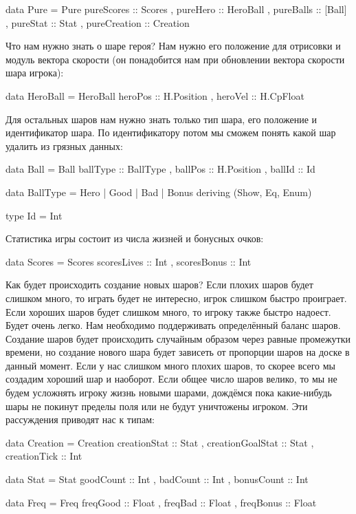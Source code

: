 \begin{code}
data Pure = Pure
    { pureScores     :: Scores
    , pureHero       :: HeroBall
    , pureBalls      :: [Ball]
    , pureStat       :: Stat
    , pureCreation   :: Creation
    }
\end{code}

Что нам нужно знать о шаре героя? Нам нужно его положение 
для отрисовки и модуль вектора скорости (он понадобится
нам при обновлении вектора скорости шара игрока):

\begin{code}
data HeroBall = HeroBall
    { heroPos   :: H.Position
    , heroVel   :: H.CpFloat
    }
\end{code}

Для остальных шаров нам нужно знать только тип шара,
его положение и идентификатор шара. По идентификатору
потом мы сможем понять какой шар удалить из грязных
данных:

\begin{code}
data Ball = Ball
    { ballType      :: BallType
    , ballPos       :: H.Position
    , ballId        :: Id
    }

data BallType = Hero | Good | Bad | Bonus
    deriving (Show, Eq, Enum)

type Id = Int
\end{code}


Статистика игры состоит из числа жизней и бонусных очков:

\begin{code}
data Scores = Scores 
    { scoresLives :: Int
    , scoresBonus :: Int
    } 
\end{code}

Как будет происходить создание новых шаров? 
Если плохих шаров будет слишком много, то играть будет не интересно,
игрок слишком быстро проиграет. Если хороших шаров будет
слишком много, то игроку также быстро надоест. Будет
очень легко. Нам необходимо поддерживать определённый баланс
шаров. Создание шаров будет происходить случайным
образом через равные промежутки времени, но создание 
нового шара будет зависеть от пропорции
шаров на доске в данный момент. Если у нас слишком много
плохих шаров, то скорее всего мы создадим хороший шар
и наоборот. Если общее число шаров велико, то мы не будем
усложнять игроку жизнь новыми шарами, дождёмся пока
какие-нибудь шары не покинут пределы поля или
не будут уничтожены игроком. Эти рассуждения приводят
нас к типам:

\begin{code}
data Creation = Creation 
    { creationStat      :: Stat
    , creationGoalStat  :: Stat
    , creationTick      :: Int
    }

data Stat = Stat
    { goodCount     :: Int
    , badCount      :: Int
    , bonusCount    :: Int
    } 

data Freq = Freq 
    { freqGood      :: Float
    , freqBad       :: Float
    , freqBonus     :: Float
    } 
\end{code}

